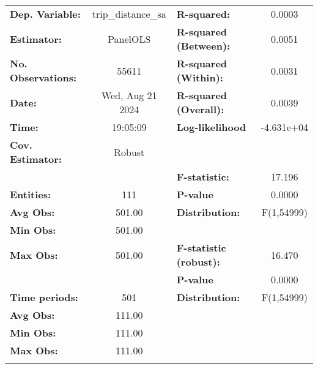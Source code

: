 \begin{center}
\begin{tabular}{lclc}
\toprule
\textbf{Dep. Variable:}    & trip\_distance\_sa & \textbf{  R-squared:         }   &      0.0003      \\
\textbf{Estimator:}        &      PanelOLS      & \textbf{  R-squared (Between):}  &      0.0051      \\
\textbf{No. Observations:} &       55611        & \textbf{  R-squared (Within):}   &      0.0031      \\
\textbf{Date:}             &  Wed, Aug 21 2024  & \textbf{  R-squared (Overall):}  &      0.0039      \\
\textbf{Time:}             &      19:05:09      & \textbf{  Log-likelihood     }   &    -4.631e+04    \\
\textbf{Cov. Estimator:}   &       Robust       & \textbf{                     }   &                  \\
\textbf{}                  &                    & \textbf{  F-statistic:       }   &      17.196      \\
\textbf{Entities:}         &        111         & \textbf{  P-value            }   &      0.0000      \\
\textbf{Avg Obs:}          &       501.00       & \textbf{  Distribution:      }   &    F(1,54999)    \\
\textbf{Min Obs:}          &       501.00       & \textbf{                     }   &                  \\
\textbf{Max Obs:}          &       501.00       & \textbf{  F-statistic (robust):} &      16.470      \\
\textbf{}                  &                    & \textbf{  P-value            }   &      0.0000      \\
\textbf{Time periods:}     &        501         & \textbf{  Distribution:      }   &    F(1,54999)    \\
\textbf{Avg Obs:}          &       111.00       & \textbf{                     }   &                  \\
\textbf{Min Obs:}          &       111.00       & \textbf{                     }   &                  \\
\textbf{Max Obs:}          &       111.00       & \textbf{                     }   &                  \\
\textbf{}                  &                    & \textbf{                     }   &                  \\
\bottomrule

\end{tabular}
\end{center}
